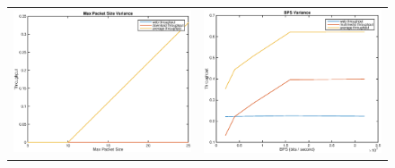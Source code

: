 \begin{figure}
\begin{tabular}{cc}
\includegraphics[scale=0.35]{../../src/fig-simulation_web_download-maxpackets-1_5.000000e-01_1_5_1_1_25.eps} & \includegraphics[scale=0.35]{../../src/fig-simulation_web_multimedia-bps-1_1_1_5_12000.eps} \\


\end{tabular}
\end{figure}
